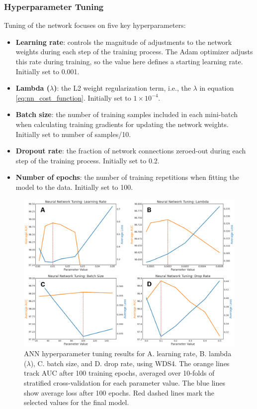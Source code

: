 \subsubsection{Hyperparameter Tuning}\label{ch5:ann_tuning}
Tuning of the network focuses on five key hyperparameters:
\begin{itemize}[itemsep=2pt]
    \item \textbf{Learning rate}: controls the magnitude of adjustments to the network weights during each step of the training process. The Adam optimizer adjusts this rate during training, so the value here defines a starting learning rate. Initially set to 0.001.
    \item \textbf{Lambda ($\lambda$)}: the L2 weight regularization term, i.e., the $\lambda$ in equation \ref{eq:nn_cost_function}. Initially set to $1\times10^{-4}$.
    \item \textbf{Batch size}: the number of training samples included in each mini-batch when calculating training gradients for updating the network weights. Initially set to number of samples/10.
    \item \textbf{Dropout rate}: the fraction of network connections zeroed-out during each step of the training process. Initially set to 0.2.
    \item \textbf{Number of epochs}: the number of training repetitions when fitting the model to the data. Initially set to 100.
\end{itemize}
\begin{figure}[htp]
\centering
\includegraphics[width=\textwidth]{templates/images/Figure-NN_Hyperparameters.png}
\caption[Neural network hyperparameter tuning]{ANN hyperparameter tuning results for A. learning rate, B. lambda ($\lambda$), C. batch size, and D. drop rate, using WDS4. The orange lines track AUC after 100 training epochs, averaged over 10-folds of stratified cross-validation for each parameter value. The blue lines show average loss after 100 epochs. Red dashed lines mark the selected values for the final model.}
\label{fig:nn_tuning_plots}
\end{figure}

